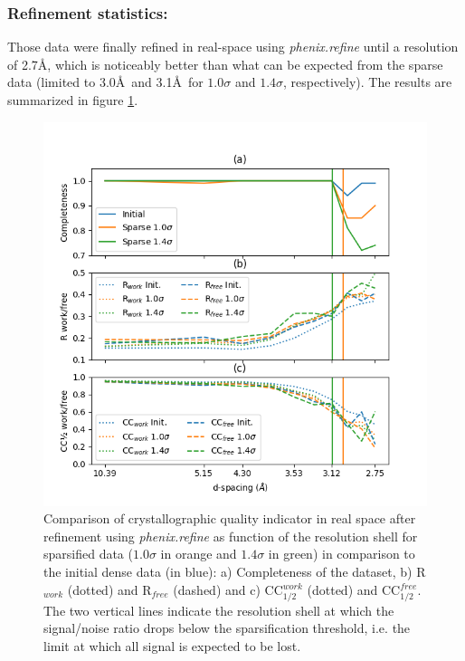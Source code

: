 \documentclass[preprint]{iucr}              %
\begin{document}
\subsubsection{Refinement statistics:}

Those data were finally refined in real-space using \textit{phenix.refine} \cite{phenix} until a resolution of 2.7\AA, which is noticeably better than what can be expected from the sparse data (limited to 3.0\AA ~and 3.1\AA ~for $1.0\sigma$ and $1.4\sigma$, respectively). 
The results are summarized in figure \ref{r-NQO1}.

\begin{figure}
\label{r-NQO1}
\includegraphics[width=12cm]{NQO1/NQO1_refine}
\caption{Comparison of crystallographic quality indicator in real space after refinement using \textit{phenix.refine} as function of the resolution shell for sparsified data ($1.0\sigma$ in orange and $1.4\sigma$ in green) in comparison to the initial dense data (in blue):
a) Completeness of the dataset, b) R$_{work}$ (dotted) and R$_{free}$ (dashed) and c) CC$_{1/2}^{work}$ (dotted) and CC$_{1/2}^{free}$.
The two vertical lines indicate the resolution shell at which the signal/noise ratio drops below the sparsification threshold, i.e. the limit at which all signal is expected to be lost.}
\end{figure}
\end{document}
